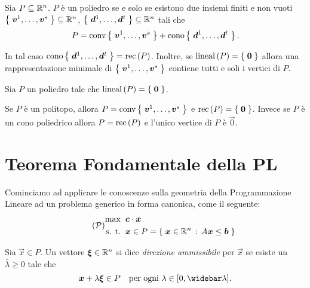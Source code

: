 \begin{theorem}
    Sia $P \subseteq \mathbb{R}^n$. $P$ è un poliedro se e solo se esistono due insiemi finiti e non vuoti $\left\{\;\bm{v}^1, \dots, \bm{v}^s\;\right\} \subseteq \mathbb{R}^n$, $\left\{\;\bm{d}^1, \dots, \bm{d}^t\;\right\} \subseteq \mathbb{R}^n$ tali che \begin{equation}
        P = \conv*{\vec v^1, \dots, \vec v^s} + \cono*{\vec d^1, \dots, \vec d^t}.
    \end{equation}

    In tal caso $\cono*{\vec d^1, \dots, \vec d^t} = \rec P$. Inoltre, se $\lineal P = \set{\vec 0}$ allora una rappresentazione minimale di $\left\{\;\bm{v}^1, \dots, \bm{v}^s\;\right\}$ contiene tutti e soli i vertici di $P$.
\end{theorem}

\begin{corollary}
    Sia $P$ un poliedro tale che $\lineal P = \set{\vec 0}$.

    Se $P$ è un politopo, allora $P = \conv*{\vec v^1, \dots, \vec v^s}$ e $\rec P = \set{\vec{0}}$. Invece se $P$ è un cono poliedrico allora $P = \rec{P}$ e l'unico vertice di $P$ è $\vec 0$.
\end{corollary}

\section{Teorema Fondamentale della PL}

Cominciamo ad applicare le conoscenze sulla geometria della Programmazione Lineare ad un problema generico in forma canonica, come il seguente:
\begin{align}
    \tag{$\PP$} \label{eq:linear_problem}
    \begin{split} 
        \max              &\;\; \vec c \cdot \vec x \\
        \text{s. t.} &\;\; \vec x \in P = \set{\vec x \in \R^n \suchthat A\vec x \leq \vec b}
    \end{split}
\end{align}

\begin{definition}
    Sia $\vec x \in P$. Un vettore $\bm{\xi} \in \mathbb{R}^n$ si dice \emph{direzione ammissibile} per $\vec x$ se esiste un $\bar\lambda \geq 0$ tale che \begin{equation}
        \vec x + \lambda\vec \xi \in P \quad \text{per ogni } \lambda \in \closedInt*{0, \bar{\lambda}}.
    \end{equation}
\end{definition}

